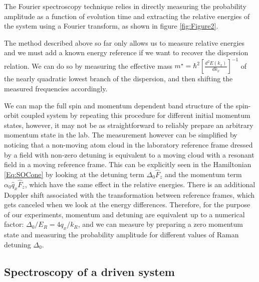 The Fourier spectroscopy technique relies in directly measuring the probability amplitude as a function of evolution time and extracting the relative energies of the system using a Fourier transform, as shown in figure \ref{fig:Figure2}.

 


The method described above so far only allows us to measure relative energies and we must add a known energy reference if we want to recover the dispersion relation. We can do so by measuring the effective mass $m^{\star} = \hbar^2[\frac{d^2E(k_x)}{dk_x}]^{-1}$ of the nearly quadratic lowest branch of the dispersion, and then shifting the measured frequencies accordingly. 

We can map the full spin and momentum dependent band structure of the spin-orbit coupled system by repeating this procedure for different initial momentum states, however, it may not be as straightforward to reliably prepare an arbitrary momentum state in the lab. The measurement however can be simplified by noticing that a non-moving atom cloud in the laboratory reference frame dressed by a field with non-zero detuning is equivalent to a moving cloud with a resonant field in a moving reference frame. This can be explicitly seen in the Hamiltonian \ref{Eq:SOCone} by looking at the detuning term $\Delta_0\hat{F}_z$ and the momentum term $\alpha_0\hat{q}_x\hat{F}_z$, which have the same effect in the relative energies. There is an additional Doppler shift associated with the transformation between reference frames, which gets canceled when we look at the energy differences. Therefore, for the purpose of our experiments, momentum and detuning are equivalent up to a numerical factor: $\Delta_0/E_R=4q_x/k_R$, and we can measure by preparing a zero momentum state and measuring the probability amplitude for different values of Raman detuning $\Delta_0$. 


\subsection{Spectroscopy of a driven system}

